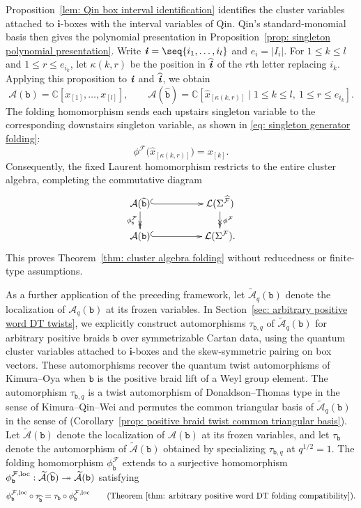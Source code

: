 \documentclass[12pt, leqno]{amsart}
\numberwithin{equation}{section}
\theoremstyle{plain}
\theoremstyle{definition}
\renewcommand{\le}{\leqslant}
\newcommand{\C}{\mathbb{C}}
\newcommand{\loc}{{\rm loc}}
\newcommand{\ii}{ \textbf{\textit{i}}}
\newcommand{\hx}{\widehat{x}}
\newcommand{\hii}{{\widehat{\ii}}}
\newcommand{\bfi}{\mathbf{i}}
\newcommand{\calA}{\mathcal{A}}
\newcommand{\calF}{\mathcal{F}}
\newcommand{\calL}{\mathcal{L}}
\newcommand{\hcalF}{{\widehat{\calF}}}
\newcommand{\tcalA}{\widetilde{\calA}}
\newcommand{\ttb}{\mathtt{b}}
\newcommand{\httb}{\widehat{\ttb}}
\begin{document}
Proposition~\ref{lem: Qin box interval identification} identifies
the cluster variables attached to $\bfi$-boxes with the interval
variables of Qin.
Qin's standard-monomial basis then gives the polynomial presentation
in Proposition~\ref{prop: singleton polynomial presentation}.
Write $\ii=\seq{i_1,\ldots,i_l}$ and $e_i=|I_i|$.
For $1\le k\le l$ and $1\le r\le e_{i_k}$, let $\kappa(k,r)$
be the position in $\hii$ of the $r$th letter replacing $i_k$.
Applying this proposition to $\ii$ and $\hii$, we obtain
\[
\calA(\ttb)=\C[x_{[1]},\ldots,x_{[l]}],
\qquad
\calA(\httb)=
\C[\hx_{[\kappa(k,r)]}\mid
1\le k\le l,\ 1\le r\le e_{i_k}].
\]
The folding homomorphism sends each upstairs singleton variable to
the corresponding downstairs singleton variable, as shown in
\eqref{eq: singleton generator folding}:
\[
\phi^\calF\bigl(\hx_{[\kappa(k,r)]}\bigr)=x_{[k]}.
\]
Consequently, the fixed Laurent homomorphism restricts to the entire
cluster algebra, completing the commutative diagram
\[
\xymatrix@C=5em@R=1.5em{
\calA(\httb)
\ar@{^{(}->}[r]
\ar@{->>}[d]_{\phi^\calF_\ttb}
&
\calL(\Sigma^{\hcalF})
\ar@{->>}[d]^{\phi^\calF}
\\
\calA(\ttb)
\ar@{^{(}->}[r]
&
\calL(\Sigma^\calF).
}
\]
This proves Theorem~\ref{thm: cluster algebra folding} without
reducedness or finite-type assumptions.

\smallskip

As a further application of the preceding framework, let
$\tcalA_q(\ttb)$ denote the localization of $\calA_q(\ttb)$ at its
frozen variables. In Section~\ref{sec: arbitrary positive word DT twists},
we explicitly construct automorphisms $\tau_{\ttb,q}$ of
$\tcalA_q(\ttb)$ for arbitrary positive braids $\ttb$
over symmetrizable Cartan data, using the quantum cluster
variables attached to $\bfi$-boxes and the skew-symmetric
pairing on box vectors.
These automorphisms recover the quantum twist automorphisms
of Kimura--Oya \cite[Theorem~6.1]{KimuraOya21}
when $\ttb$ is the positive braid lift of a Weyl group element.
The automorphism $\tau_{\ttb,q}$ is a twist automorphism of
Donaldson--Thomas type in the sense of Kimura--Qin--Wei
\cite{KimuraQinWei} and permutes the common triangular basis of
$\tcalA_q(\ttb)$ in the sense of
\cite[Definitions~6.2.1--6.2.2]{Qin20}
(Corollary~\ref{prop: positive braid twist common triangular basis}).
Let $\tcalA(\ttb)$ denote the localization of $\calA(\ttb)$
at its frozen variables, and let $\tau_\ttb$ denote the automorphism
of $\tcalA(\ttb)$ obtained by specializing $\tau_{\ttb,q}$ at $q^{1/2}=1$.
The folding homomorphism $\phi^\calF_\ttb$ extends to a surjective homomorphism
$\phi^{\calF,\loc}_\ttb:
\tcalA(\httb)\twoheadrightarrow\tcalA(\ttb)$ satisfying
\[
\phi^{\calF,\loc}_\ttb\circ\tau_{\httb}
=\tau_\ttb\circ\phi^{\calF,\loc}_\ttb
\qquad
\text{(Theorem~\ref{thm: arbitrary positive word DT folding compatibility}).}
\]
\end{document}

